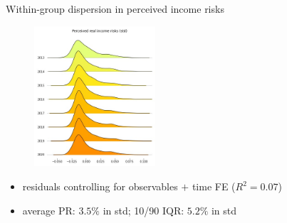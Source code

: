 \documentclass{beamer}
\begin{document}
\begin{frame}{Within-group dispersion in perceived income risks}
	\begin{figure}
		\centering
		\label{rincstd_hist}
		\includegraphics[width=0.4\textwidth]{figures/joy_rincstd.jpg}
	\end{figure}
	\begin{itemize}
		\item  residuals controlling for observables $+$ time FE ($R^2=0.07$) 
		\item average PR:  $3.5\%$ in std; 10/90 IQR: $5.2\%$ in std \quad \hyperlink{appendix:incstd}{}  \quad
		 \hyperlink{appendix:incskew}{}    
	\end{itemize}
\end{frame}
\end{document}
